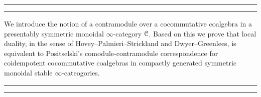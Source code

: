 

\vspace*{5cm}

{\par{}\par}
\vspace{-2em}
\rule[-11pt]{\textwidth}{1pt}
\rule{\textwidth}{0.5pt}
    
We introduce the notion of a contramodule over a cocommutative coalgebra in a presentably symmetric monoidal $\infty$-category $\EuScript{C}$. Based on this we prove that local duality, in the sense of Hovey--Palmieri--Strickland and Dwyer--Greenlees, is equivalent to Positselski's comodule-contramodule correspondence for coidempotent cocommutative coalgebras in compactly generated symmetric monoidal stable $\infty$-cateogories. 

\rule{\textwidth}{0.5pt}
\rule[11pt]{\textwidth}{1pt}
\vspace{\fill}

